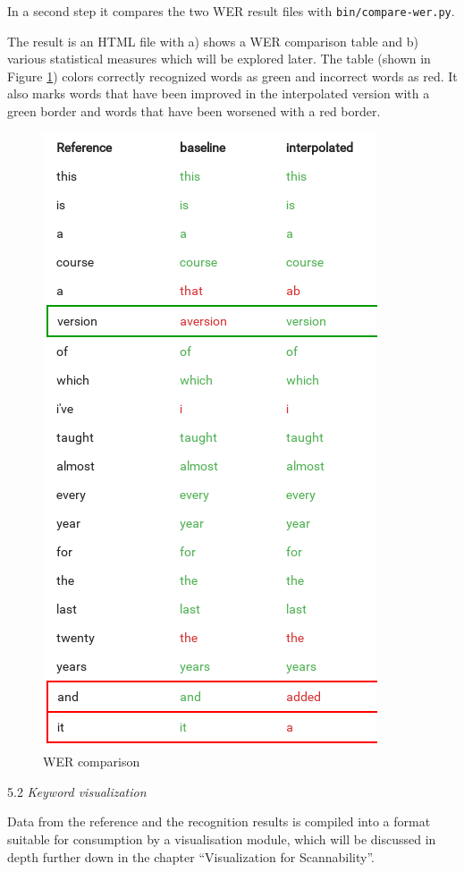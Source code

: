 \documentclass[]{article}
\begin{document}
\begin{enumerate}
  In a second step it compares the two WER result files with
  \texttt{bin/compare-wer.py}.

  The result is an HTML file with a) shows a WER comparison table and b)
  various statistical measures which will be explored later. The table
  (shown in Figure \ref{wer-comparison}) colors correctly recognized
  words as green and incorrect words as red. It also marks words that
  have been improved in the interpolated version with a green border and
  words that have been worsened with a red border.

  \begin{figure}[htbp]
  \centering
  \includegraphics{images/wer-comparison_150.png}
  \caption{WER comparison\label{wer-comparison}}
  \end{figure}

  5.2 \emph{Keyword visualization}

  Data from the reference and the recognition results is compiled into a
  format suitable for consumption by a visualisation module, which will
  be discussed in depth further down in the chapter ``Visualization for
  Scannability''.
\end{enumerate}
\end{document}
